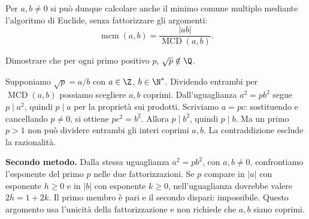 Per $a,b\ne0$ si può dunque calcolare anche il minimo comune multiplo mediante l'algoritmo di Euclide, senza fattorizzare gli argomenti:
\[
\operatorname{mcm}(a,b)=\frac{|ab|}{\operatorname{MCD}(a,b)}.
\]

\begin{esercizio}
Dimostrare che per ogni primo positivo $p$, $\sqrt p\notin\Q$.
\end{esercizio}
\begin{svolgimento}
Supponiamo $\sqrt p=a/b$ con $a\in\Z$, $b\in\N^*$. Dividendo entrambi per $\operatorname{MCD}(a,b)$ possiamo scegliere $a,b$ coprimi. Dall'uguaglianza $a^2=pb^2$ segue $p\mid a^2$, quindi $p\mid a$ per la proprietà sui prodotti. Scriviamo $a=pc$: sostituendo e cancellando $p\ne0$, si ottiene $pc^2=b^2$. Allora $p\mid b^2$, quindi $p\mid b$. Ma un primo $p>1$ non può dividere entrambi gli interi coprimi $a,b$. La contraddizione esclude la razionalità.

\textbf{Secondo metodo.} Dalla stessa uguaglianza $a^2=pb^2$, con $a,b\ne0$, confrontiamo l'esponente del primo $p$ nelle due fattorizzazioni. Se $p$ compare in $|a|$ con esponente $h\ge0$ e in $|b|$ con esponente $k\ge0$, nell'uguaglianza dovrebbe valere $2h=1+2k$. Il primo membro è pari e il secondo dispari: impossibile. Questo argomento usa l'unicità della fattorizzazione e non richiede che $a,b$ siano coprimi.
\end{svolgimento}
